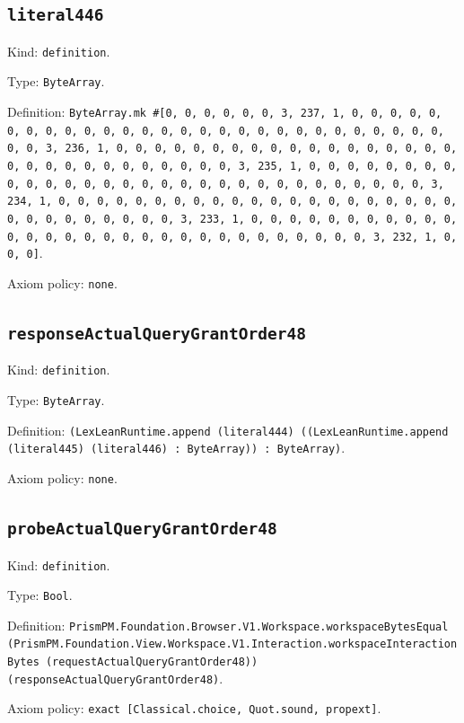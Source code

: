 \documentclass[11pt]{article}
\begin{document}
\subsection*{\texttt{literal446}}
\noindent Kind: \texttt{definition}.\par
\noindent Type: \texttt{ByteArray}.\par
\noindent Definition: \texttt{ByteArray.mk \#[0, 0, 0, 0, 0, 0, 3, 237, 1, 0, 0, 0, 0, 0, 0, 0, 0, 0, 0, 0, 0, 0, 0, 0, 0, 0, 0, 0, 0, 0, 0, 0, 0, 0, 0, 0, 0, 0, 0, 3, 236, 1, 0, 0, 0, 0, 0, 0, 0, 0, 0, 0, 0, 0, 0, 0, 0, 0, 0, 0, 0, 0, 0, 0, 0, 0, 0, 0, 0, 0, 0, 0, 3, 235, 1, 0, 0, 0, 0, 0, 0, 0, 0, 0, 0, 0, 0, 0, 0, 0, 0, 0, 0, 0, 0, 0, 0, 0, 0, 0, 0, 0, 0, 0, 0, 3, 234, 1, 0, 0, 0, 0, 0, 0, 0, 0, 0, 0, 0, 0, 0, 0, 0, 0, 0, 0, 0, 0, 0, 0, 0, 0, 0, 0, 0, 0, 0, 0, 3, 233, 1, 0, 0, 0, 0, 0, 0, 0, 0, 0, 0, 0, 0, 0, 0, 0, 0, 0, 0, 0, 0, 0, 0, 0, 0, 0, 0, 0, 0, 0, 0, 3, 232, 1, 0, 0, 0]}.\par
\noindent Axiom policy: \texttt{none}.\par
\subsection*{\texttt{responseActualQueryGrantOrder48}}
\noindent Kind: \texttt{definition}.\par
\noindent Type: \texttt{ByteArray}.\par
\noindent Definition: \texttt{(LexLeanRuntime.append (literal444) ((LexLeanRuntime.append (literal445) (literal446) : ByteArray)) : ByteArray)}.\par
\noindent Axiom policy: \texttt{none}.\par
\subsection*{\texttt{probeActualQueryGrantOrder48}}
\noindent Kind: \texttt{definition}.\par
\noindent Type: \texttt{Bool}.\par
\noindent Definition: \texttt{PrismPM.Foundation.Browser.V1.Workspace.workspaceBytesEqual (PrismPM.Foundation.View.Workspace.V1.Interaction.workspaceInteractionBytes (requestActualQueryGrantOrder48)) (responseActualQueryGrantOrder48)}.\par
\noindent Axiom policy: \texttt{exact [Classical.choice, Quot.sound, propext]}.\par
\end{document}
